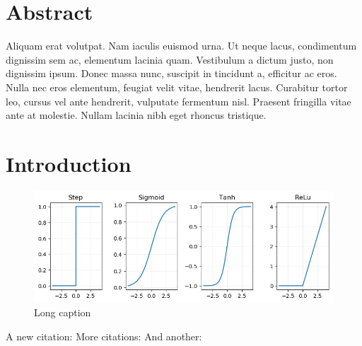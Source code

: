\begin{refsection}
\section*{Abstract}
Aliquam erat volutpat. Nam iaculis euismod urna. Ut neque lacus, condimentum dignissim sem ac, elementum lacinia quam. Vestibulum a dictum justo, non dignissim ipsum. Donec massa nunc, suscipit in tincidunt a, efficitur ac eros. Nulla nec eros elementum, feugiat velit vitae, hendrerit lacus. Curabitur tortor leo, cursus vel ante hendrerit, vulputate fermentum nisl. Praesent fringilla vitae ante at molestie. Nullam lacinia nibh eget rhoncus tristique.



\section{Introduction} %
\label{sec:intro}

\begin{figure}[tbp]
	\centering
	\includegraphics[width=1\textwidth]{./publication3_figures/figure_11_activation_funcs.png}
	\caption[Short Caption]{Long caption}
	\label{fig:label2}
\end{figure}



A new citation: \citep{Bernard1997}
More citations: \citep{Hyvarinen1997}
And another: \citep{Mogi1958}


\printbibliography[heading=subbibliography]
\end{refsection}
